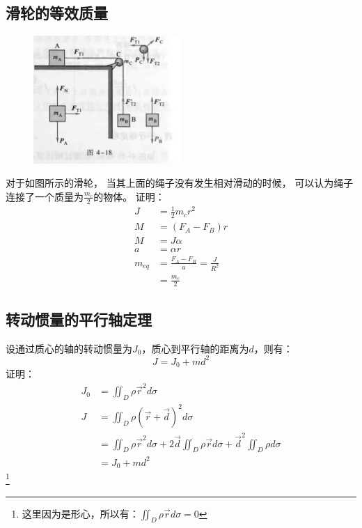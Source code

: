 \documentclass{ctexart}
\begin{document}
\subsection{滑轮的等效质量}
\begin{figure}[H]
    \centering
    \includegraphics[width=0.5\textwidth]{img/4-18.jpg}
\end{figure}
对于如图所示的滑轮，
当其上面的绳子没有发生相对滑动的时候，
可以认为绳子连接了一个质量为$\frac{m_c}{2}$的物体。
证明：\\
\begin{align*}
    J       & = \frac{1}{2}m_c r^2                  \\
    M       & = (F_A - F_B)r                        \\
    M       & = J \alpha                            \\
    a       & = \alpha r                            \\
    m_{eq}  & = \frac{F_A - F_B}{a} = \frac{J}{R^2} \\
            & = \frac{m_c}{2}
\end{align*}
\subsection{转动惯量的平行轴定理}
设通过质心的轴的转动惯量为$J_0$，质心到平行轴的距离为$d$，则有：
$$
    J = J_0 + md^2
$$
证明：\\
\begin{align*}
    J_0 & = \iint_{D} \rho \vec{r}^2 d \sigma                                                                                                                   \\
    J   & = \iint_{D} \rho (\vec{r} + \vec{d})^2 d \sigma                                                                                            \\
        & = \iint_{D} \rho \vec{r}^2 d \sigma + 2 \vec{d} \iint_{D} \rho \vec{r} d \sigma + \vec{d}^2 \iint_{D} \rho  d \sigma \\
        & = J_0 + m d^2
\end{align*}
\footnote{这里因为是形心，所以有：$\iint_{D} \rho \vec{r} d \sigma = 0$}
\end{document}
